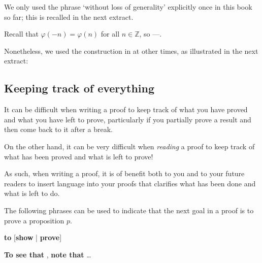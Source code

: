 We only used the phrase `without loss of generality' explicitly once in this book so far; this is recalled in the next extract.

\begin{extract}
\label{xtrWlogExample}
Recall that $\varphi(-n) = \varphi(n)$ for all $n \in \mathbb{Z}$, so  ---.
\end{extract}

Nonetheless, we used the construction in  at other times, as illustrated in the next extract:

\begin{extract}
\label{xtrWlogExampleTwo}
\end{extract}

\subsection*{Keeping track of everything}

It can be difficult when writing a proof to keep track of what you have proved and what you have left to prove, particularly if you partially prove a result and then come back to it after a break.

On the other hand, it can be very difficult when \textit{reading} a proof to keep track of what has been proved and what is left to prove!

As such, when writing a proof, it is of benefit both to you and to your future readers to insert language into your proofs that clarifies what has been done and what is left to do.

\begin{vocabulary}
\label{vcbStatingGoal}
The following phrases can be used to indicate that the next goal in a proof is to prove a proposition $p$.

\begin{vocabtemplate}
 \textbf{to} [\textbf{show} | \textbf{prove}] 

\vtor

\textbf{To see that} , \textbf{note that} \dots{}
\end{vocabtemplate}
\end{vocabulary}

